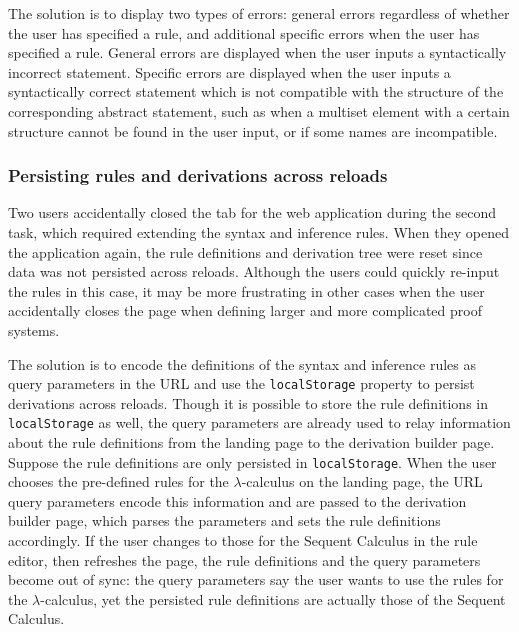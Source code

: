 The solution is to display two types of errors: general errors regardless of whether the user has specified a rule, and additional specific errors when the user has specified a rule. General errors are displayed when the user inputs a syntactically incorrect statement. Specific errors are displayed when the user inputs a syntactically correct statement which is not compatible with the structure of the corresponding abstract statement, such as when a multiset element with a certain structure cannot be found in the user input, or if some names are incompatible.

\subsubsection{Persisting rules and derivations across reloads}
Two users accidentally closed the tab for the web application during the second task, which required extending the syntax and inference rules. When they opened the application again, the rule definitions and derivation tree were reset since data was not persisted across reloads. Although the users could quickly re-input the rules in this case, it may be more frustrating in other cases when the user accidentally closes the page when defining larger and more complicated proof systems.

The solution is to encode the definitions of the syntax and inference rules as query parameters in the URL and use the \lstinline{localStorage} property \cite{localstorage} to persist derivations across reloads. Though it is possible to store the rule definitions in \lstinline{localStorage} as well, the query parameters are already used to relay information about the rule definitions from the landing page to the derivation builder page. Suppose the rule definitions are only persisted in \lstinline{localStorage}. When the user chooses the pre-defined rules for the $\lambda$-calculus on the landing page, the URL query parameters encode this information and are passed to the derivation builder page, which parses the parameters and sets the rule definitions accordingly. If the user changes to those for the Sequent Calculus in the rule editor, then refreshes the page, the rule definitions and the query parameters become out of sync: the query parameters say the user wants to use the rules for the $\lambda$-calculus, yet the persisted rule definitions are actually those of the Sequent Calculus.